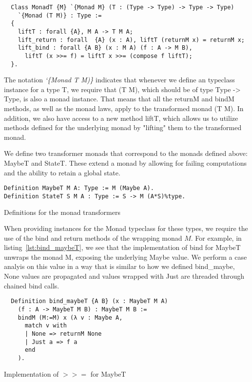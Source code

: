 \begin{listing}
\begin{verbatim}
  Class MonadT {M} `{Monad M} (T : (Type -> Type) -> Type -> Type) 
    `{Monad (T M)} : Type :=
  {
    liftT : forall {A}, M A -> T M A;
    lift_return : forall  {A} (x : A), liftT (returnM x) = returnM x;
    lift_bind : forall {A B} (x : M A) (f : A -> M B),
      liftT (x >>= f) = liftT x >>= (compose f liftT);
  }.
\end{verbatim}
\end{listing}

The notation \textit{`\{Monad T M)\}} indicates that whenever we define an
typeclass instance for a type T, we require that (T M), which should be of type
Type -> Type, is also a monad instance. That means that all the returnM and
bindM methods, as well as the monad laws, apply to the transformed monad (T M).
In addition, we also have access to a new method liftT, which allows us to
utilize methods defined for the underlying monad by "lifting" them to the
transformed monad. 

We define two transformer monads that correspond to the monads defined above:
MaybeT and StateT. These extend a monad by allowing for failing computations
and the ability to retain a global state. 

\begin{listing}
\begin{verbatim}
Definition MaybeT M A: Type := M (Maybe A).
Definition StateT S M A : Type := S -> M (A*S)%type.
\end{verbatim}
\caption{Definitions for the monad transformers}
\end{listing}

When providing instances for the Monad typeclass for these types, we require
the use of the bind and return methods of the wrapping monad $M$.
For example, in listing~\ref{lst:bind_maybeT}, we see that the implementation 
of  bind for MaybeT
unwraps the monad M, exposing the underlying Maybe value. We perform a case
analyis on this value in a way that is similar to how we defined bind\_maybe,
None values are propagated and values wrapped with Just are threaded through
chained bind calls.

\begin{listing}
\begin{verbatim}
  Definition bind_maybeT {A B} (x : MaybeT M A) 
    (f : A -> MaybeT M B) : MaybeT M B :=
    bindM (M:=M) x (λ v : Maybe A,
      match v with
      | None => returnM None
      | Just a => f a
      end
    ).
\end{verbatim}
\caption{Implementation of $>>=$ for MaybeT}
\label{lst:bind_maybeT}
\end{listing}

